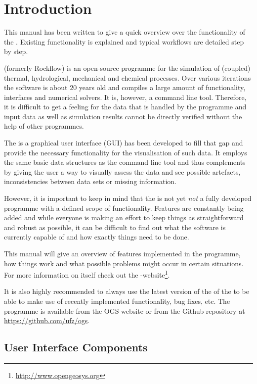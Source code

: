 \chapter{Introduction}

This manual has been written to give a quick overview over the functionality of the \ogsde{}. Existing functionality is explained and typical workflows are detailed step by step.

\bigskip

\ogs{} (formerly Rockflow) is an open-source programme for the simulation of (coupled) thermal, hydrological, mechanical and chemical processes. Over various iterations the software is about $20$ years old and compiles a large amount of functionality, interfaces and numerical solvers. It is, however, a command line tool. Therefore, it is difficult to get a feeling for the data that is handled by the programme and input data as well as simulation results cannot be directly verified without the help of other programmes.

The \ogsde{} is a graphical user interface (GUI) has been developed to fill that gap and provide the necessary functionality for the visualisation of such data. It employs the same basic data structures as the command line tool and thus complements \ogs{} by giving the user a way to visually assess the data and see possible artefacts, inconsistencies between data sets or missing information.

However, it is important to keep in mind that the \ogsde{} is not yet \emph{not} a fully developed programme with a defined scope of functionality. Features are constantly being added and while everyone is making an effort to keep things as straightforward and robust as possible, it can be difficult to find out what the software is currently capable of and how exactly things need to be done.

This manual will give an overview of features implemented in the programme, how things work and what possible problems might occur in certain situations. For more information on \ogs{} itself check out the \ogs{}-website\footnote{\url{http://www.opengeosys.org}}.

It is also highly recommended to always use the latest version of the  of the \de{} to be able to make use of recently implemented functionality, bug fixes, etc. The programme is available from the OGS-website or from the Github repository at \url{https://github.com/ufz/ogs}.

\section{User Interface Components}

